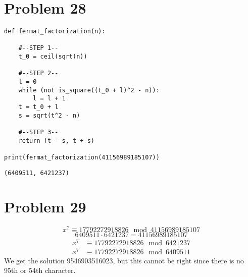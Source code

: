 \documentclass{article}
\theoremstyle{definition}
\begin{document}
\section*{Problem 28}
\begin{mdframed}
    \begin{verbatim}
def fermat_factorization(n):

    #--STEP 1--
    t_0 = ceil(sqrt(n))
    
    #--STEP 2--
    l = 0
    while (not is_square((t_0 + l)^2 - n)):
        l = l + 1
    t = t_0 + l
    s = sqrt(t^2 - n)
    
    #--STEP 3--
    return (t - s, t + s)

print(fermat_factorization(41156989185107))
    \end{verbatim}
    \begin{verbatim}
(6409511, 6421237)
    \end{verbatim}
\end{mdframed}
\section*{Problem 29}
\[
x^7 \equiv 17792272918826 \mod{41156989185107}
\]
\[
    6409511 \cdot 6421237 = 41156989185107
\]
\begin{align}
    x^7 &\equiv 17792272918826 \mod{6421237}\\
    x^7 &\equiv 17792272918826 \mod{6409511}
\end{align}
We get the solution 9546903516023, but this cannot be right since there is no 95th or 54th
character.
\end{document}
